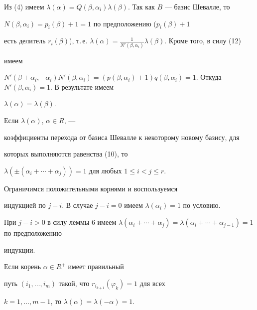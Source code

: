 \begin{pf}


Из (4) имеем $\lambda(\alpha)=


Q(\beta,\alpha_i)\lambda(\beta)$. Так как $B$ --- базис Шевалле, то


$N(\beta,\alpha_i)=p_i(\beta)+1=1$ по предположению ($p_i(\beta)+1$


есть делитель $r_i(\beta)$), т.\,е. $\lambda(\alpha)=


\frac1{N'(\beta,\alpha_i)}\lambda(\beta)$. Кроме того, в силу (12)


имеем


$N'(\beta+\alpha_i,-\alpha_i)N'(\beta,\alpha_i)=(p(\beta,\alpha_i)+1)


q(\beta,\alpha_i)=1$. Откуда $N'(\beta,\alpha_i)=1$. В результате имеем


$\lambda(\alpha)=\lambda(\beta)$.


\end{pf}





\begin{cor}


Если $\lambda(\alpha)$, $\alpha\in R$, ---


коэффициенты перехода от базиса Шевалле к некоторому новому базису, для


которых выполняются равенства (10), то


$\lambda(\pm(\alpha_i+\dotsb+\alpha_j))=1$ для любых $1\le i<j\le r$.


\end{cor}





\begin{pf}


Ограничимся положительными корнями и воспользуемся


индукцией по $j-i$. В случае $j-i=0$ имеем $\lambda(\alpha_i)=1$ по условию.


При $j-i>0$ в силу леммы 6 имеем $\lambda(\alpha_i+\dotsb+


\alpha_j)=\lambda(\alpha_i+\dotsb+\alpha_{j-1})=1$ по предположению


индукции.


\end{pf}





\begin{lem}


Если корень $\alpha\in R^+$ имеет правильный


путь $(i_1,\dotsc,i_m)$ такой, что $r_{i_{k+1}}(\varphi_k)=1$ для всех


$k=1,\dotsc,m-1$, то $\lambda(\alpha)=\lambda(-\alpha)=1$.


\end{lem}





